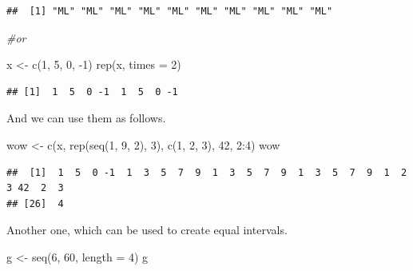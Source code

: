 \documentclass[
]{book}
\newenvironment{Shaded}{\begin{snugshade}}{\end{snugshade}}
\newcommand{\AttributeTok}[1]{\textcolor[rgb]{0.77,0.63,0.00}{#1}}
\newcommand{\CommentTok}[1]{\textcolor[rgb]{0.56,0.35,0.01}{\textit{#1}}}
\newcommand{\DecValTok}[1]{\textcolor[rgb]{0.00,0.00,0.81}{#1}}
\newcommand{\FunctionTok}[1]{\textcolor[rgb]{0.00,0.00,0.00}{#1}}
\newcommand{\NormalTok}[1]{#1}
\newcommand{\OtherTok}[1]{\textcolor[rgb]{0.56,0.35,0.01}{#1}}
\newcommand{\SpecialCharTok}[1]{\textcolor[rgb]{0.00,0.00,0.00}{#1}}
\theoremstyle{definition}
\theoremstyle{definition}
\theoremstyle{definition}
\theoremstyle{definition}
\theoremstyle{remark}
\begin{document}
\begin{verbatim}
##  [1] "ML" "ML" "ML" "ML" "ML" "ML" "ML" "ML" "ML" "ML"
\end{verbatim}

\begin{Shaded}
\begin{Highlighting}[]
\CommentTok{\#or}

\NormalTok{x }\OtherTok{\textless{}{-}} \FunctionTok{c}\NormalTok{(}\DecValTok{1}\NormalTok{, }\DecValTok{5}\NormalTok{, }\DecValTok{0}\NormalTok{, }\SpecialCharTok{{-}}\DecValTok{1}\NormalTok{)}
\FunctionTok{rep}\NormalTok{(x, }\AttributeTok{times =} \DecValTok{2}\NormalTok{)}
\end{Highlighting}
\end{Shaded}

\begin{verbatim}
## [1]  1  5  0 -1  1  5  0 -1
\end{verbatim}

And we can use them as follows.

\begin{Shaded}
\begin{Highlighting}[]
\NormalTok{wow }\OtherTok{\textless{}{-}} \FunctionTok{c}\NormalTok{(x, }\FunctionTok{rep}\NormalTok{(}\FunctionTok{seq}\NormalTok{(}\DecValTok{1}\NormalTok{, }\DecValTok{9}\NormalTok{, }\DecValTok{2}\NormalTok{), }\DecValTok{3}\NormalTok{), }\FunctionTok{c}\NormalTok{(}\DecValTok{1}\NormalTok{, }\DecValTok{2}\NormalTok{, }\DecValTok{3}\NormalTok{), }\DecValTok{42}\NormalTok{, }\DecValTok{2}\SpecialCharTok{:}\DecValTok{4}\NormalTok{)}
\NormalTok{wow}
\end{Highlighting}
\end{Shaded}

\begin{verbatim}
##  [1]  1  5  0 -1  1  3  5  7  9  1  3  5  7  9  1  3  5  7  9  1  2  3 42  2  3
## [26]  4
\end{verbatim}

Another one, which can be used to create equal intervals.

\begin{Shaded}
\begin{Highlighting}[]
\NormalTok{g }\OtherTok{\textless{}{-}} \FunctionTok{seq}\NormalTok{(}\DecValTok{6}\NormalTok{, }\DecValTok{60}\NormalTok{, }\AttributeTok{length =} \DecValTok{4}\NormalTok{)}
\NormalTok{g}
\end{Highlighting}
\end{Shaded}
\end{document}
